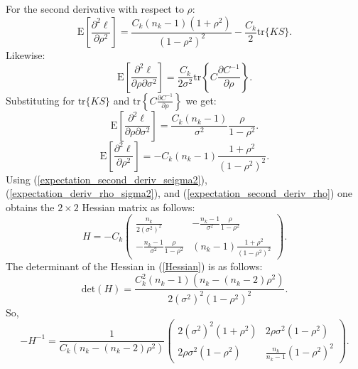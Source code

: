 \documentclass[11pt,a5paper,twoside]{book}
\begin{document}
{For the second derivative with respect to $\rho$:
\begin{equation}
\label{expectation_second_deriv_rho1}
\mathrm{E}\left[\frac{\partial^2\ell}{\partial \rho^2} \right]=\frac{C_k(n_k-1)(1+\rho^2)}{(1-\rho^2)^2}-\frac{C_k}{2}\mathrm{tr}\{KS\}.
\end{equation}
Likewise:
\begin{equation}
\label{expectation_deriv_rho_sigma2_1}
\mathrm{E}\left[\frac{\partial^2 \ell}{\partial \rho \partial \sigma^2} \right]=\frac{C_k}{2\sigma^2}\mathrm{tr}\left\{C \frac{\partial C^{-1}}{\partial \rho} \right\}.
\end{equation}
Substituting for $\mathrm{tr}\{KS\}$ and $\mathrm{tr}\left\{C \frac{\partial C^{-1}}{\partial \rho} \right\}$ we get:
\begin{equation}
\label{expectation_deriv_rho_sigma2}
\mathrm{E}\left[\frac{\partial^2 \ell}{\partial \rho \partial \sigma^2} \right]=\frac{C_k(n_k-1)}{\sigma^2}\frac{\rho}{1-\rho^2}.
\end{equation}
\begin{equation}
\label{expectation_second_deriv_rho}
\mathrm{E}\left[\frac{\partial^2\ell}{\partial \rho^2} \right]=-C_k(n_k-1)\frac{1+\rho^2}{(1-\rho^2)^2}.
\end{equation}
Using (\ref{expectation_second_deriv_seigma2}), (\ref{expectation_deriv_rho_sigma2}), and (\ref{expectation_second_deriv_rho}) one obtains the $2\times 2$ Hessian matrix as follows:
\begin{equation}
\label{Hessian}
H=-C_k
\begin{pmatrix}
\frac{n_k}{2(\sigma^2)^2} & -\frac{n_k-1}{\sigma^2} \frac{\rho}{1-\rho^2}\\
-\frac{n_k-1}{\sigma^2} \frac{\rho}{1-\rho^2} & (n_k-1)\frac{1+\rho^2}{(1-\rho^2)^2}
\end{pmatrix}.
\end{equation}
The determinant of the Hessian in (\ref{Hessian}) is as follows:
\begin{equation}
\label{det_hessian}
\mathrm{det}(H)=\frac{C_k^2(n_k-1)(n_k-(n_k-2)\rho^2)}{2(\sigma^2)^2 (1-\rho^2)^2}.
\end{equation}
So,
\begin{equation}
\label{Covariance_biased}
-H^{-1}=\frac{1}{C_k(n_k-(n_k-2)\rho^2)} \begin{pmatrix}
2(\sigma^2)^2 (1+\rho^2) & 2\rho \sigma^2 (1-\rho^2)\\
2\rho \sigma^2 (1-\rho^2) & \frac{n_k}{n_k-1} (1-\rho^2)^2
\end{pmatrix}.

\end{equation}}
\end{document}
